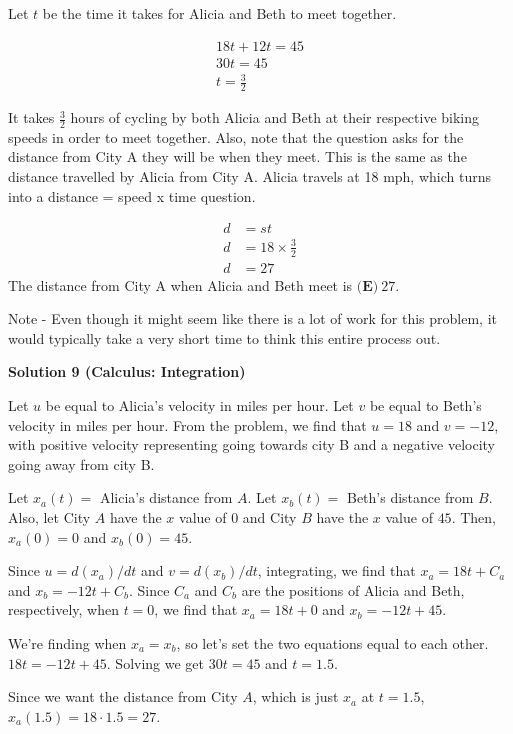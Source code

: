 \begin{enumerate}
 Let $t$ be the time it takes for Alicia and Beth to meet together.

 \begin{align*}18t + 12t = 45 \\30t = 45 \\t = \frac{3}{2}\end{align*}


 It takes $\frac{3}{2}$  hours of cycling by both Alicia and Beth at their respective biking speeds in order to meet together. Also, note that the question asks for the distance from City A they will be when they meet. This is the same as the distance travelled by Alicia from City A. Alicia travels at 18 mph, which turns into a distance = speed x time question. 

 \begin{align*}d &= st \\d &= 18 \times \frac{3}{2} \\d &= 27\end{align*}
The distance from City A when Alicia and Beth meet is $\boxed{\textbf{(E)}\ 27}$.

 Note - Even though it might seem like there is a lot of work for this problem, it would typically take a very short time to think this entire process out. 

 



\textbf{Solution 9 (Calculus: Integration)}

Let $u$ be equal to Alicia's velocity in miles per hour. Let $v$ be equal to Beth's velocity in miles per hour. From the problem, we find that $u = 18$ and $v = -12$, with positive velocity representing going towards city B and a negative velocity going away from city B. 

 Let $x_a(t) =$ Alicia's distance from $A$. Let $x_b(t) =$ Beth's distance from $B$. Also, let City $A$ have the $x$ value of $0$ and City $B$ have the $x$ value of $45$. Then, $x_a(0) = 0$ and $x_b(0) = 45$.

 Since $u = d(x_a)/dt$ and $v = d(x_b)/dt$, integrating, we find that $x_a = 18t+C_a$ and $x_b = -12t+C_b$. Since $C_a$ and $C_b$ are the positions of Alicia and Beth, respectively, when $t=0$, we find that $x_a=18t+0$ and $x_b=-12t+45$. 

 We're finding when $x_a=x_b$, so let's set the two equations equal to each other. $18t = -12t + 45$. Solving we get $30t = 45$ and $t = 1.5$. 

 Since we want the distance from City $A$, which is just $x_a$ at $t=1.5$, $x_a(1.5) = 18 \cdot 1.5 = 27$. 


\end{enumerate}
